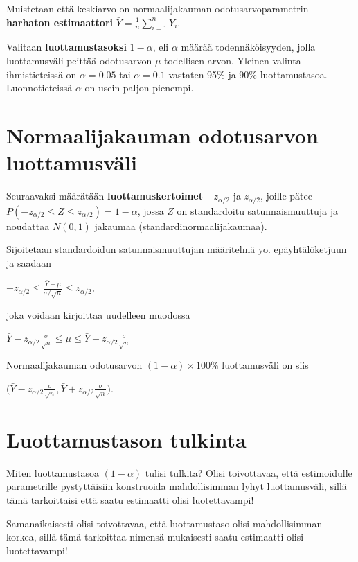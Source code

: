 \documentclass[
]{report}
\begin{document}
Muistetaan että keskiarvo on normaalijakauman odotusarvoparametrin
\textbf{harhaton estimaattori}
\(\bar{Y} = \frac{1}{n}\sum_{i=1}^n Y_i\).

Valitaan \textbf{luottamustasoksi} \(1-\alpha\), eli \(\alpha\) määrää
todennäköisyyden, jolla luottamusväli peittää odotusarvon \(\mu\)
todellisen arvon. Yleinen valinta ihmistieteissä on \(\alpha = 0.05\)
tai \(\alpha = 0.1\) vastaten 95\% ja 90\% luottamustasoa.
Luonnotieteissä \(\alpha\) on usein paljon pienempi.

\hypertarget{normaalijakauman-odotusarvon-luottamusvuxe4li-1}{%
\section{Normaalijakauman odotusarvon
luottamusväli}\label{normaalijakauman-odotusarvon-luottamusvuxe4li-1}}

Seuraavaksi määrätään \textbf{luottamuskertoimet} \(-z_{\alpha/2}\) ja
\(z_{\alpha/2}\), joille pätee
\(P(-z_{\alpha/2} \leq Z \leq z_{\alpha/2}) = 1 - \alpha\), jossa \(Z\)
on standardoitu satunnaismuuttuja ja noudattaa \(N(0,1)\) jakaumaa
(standardinormaalijakaumaa).

Sijoitetaan standardoidun satunnaismuuttujan määritelmä yo.
epäyhtälöketjuun ja saadaan

\(-z_{\alpha/2} \le \frac{\bar{Y} - \mu}{\sigma / \sqrt{n}} \le z_{\alpha/2}\),

joka voidaan kirjoittaa uudelleen muodossa

\(\bar{Y} - z_{\alpha/2} \frac{\sigma}{\sqrt{n}} \le \mu \le \bar{Y} + z_{\alpha/2} \frac{\sigma}{\sqrt{n}}\)

Normaalijakauman odotusarvon \((1-\alpha)\times 100\%\) luottamusväli on
siis

\(\Big(\bar{Y} - z_{\alpha/2} \frac{\sigma}{\sqrt{n}}, \bar{Y} + z_{\alpha/2} \frac{\sigma}{\sqrt{n}} \Big).\)

\hypertarget{luottamustason-tulkinta}{%
\section{Luottamustason tulkinta}\label{luottamustason-tulkinta}}

Miten luottamustasoa \((1-\alpha)\) tulisi tulkita? Olisi toivottavaa,
että estimoidulle parametrille pystyttäisiin konstruoida mahdollisimman
lyhyt luottamusväli, sillä tämä tarkoittaisi että saatu estimaatti olisi
luotettavampi!

Samanaikaisesti olisi toivottavaa, että luottamustaso olisi
mahdollisimman korkea, sillä tämä tarkoittaa nimensä mukaisesti saatu
estimaatti olisi luotettavampi!
\end{document}
